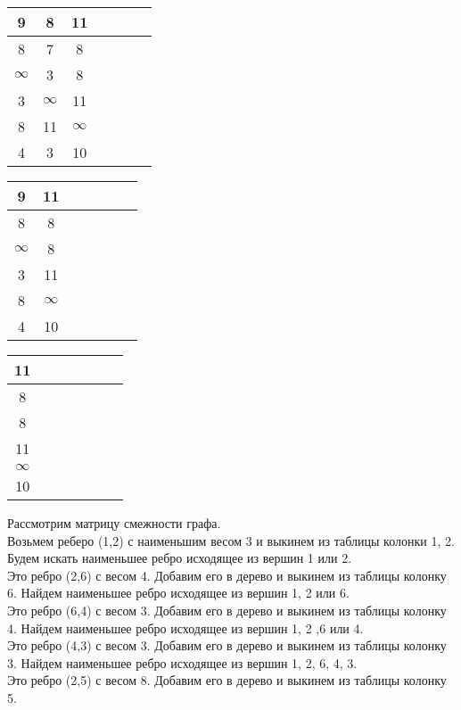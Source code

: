 \documentclass[a4paper,10pt]{article} %
\begin{document}
\begin{tabular}[]{|c|c|c|c|c|c|c|}
\hline
 \rowcolor{goodrow}  9 &    8 &   11 \\
\hline
 \rowcolor{goodrow} 8 &    7 &    8  \\
\hline
  $\infty$ &    3 &    8 \\
\hline
    3 &  $\infty$ &   11 \\
\hline
    8 &   11 &  $\infty$ \\
\hline
 \rowcolor{goodrow}    4 &    \cellcolor{yellow}3 &   10 \\
\hline
\end{tabular}
\hspace{7cm}
\begin{tabular}[]{|c|c|c|c|c|c|c|}
\hline
 \rowcolor{goodrow}  9 &   11 \\
\hline
 \rowcolor{goodrow} 8 &    8  \\
\hline
  $\infty$ &    8 \\
\hline
\rowcolor{goodrow}   \cellcolor{yellow}3 &   11 \\
\hline
    8 &  $\infty$ \\
\hline
 \rowcolor{goodrow}    4 &   10 \\
\hline
\end{tabular}

\medskip

\begin{tabular}[]{|c|c|c|c|c|c|c|}
\hline
 \rowcolor{goodrow}  11 \\
\hline
 \rowcolor{goodrow}  \cellcolor{yellow}8  \\
\hline
  \rowcolor{goodrow} 8 \\
\hline
\rowcolor{goodrow}  11 \\
\hline
 $\infty$ \\
\hline
 \rowcolor{goodrow}   10 \\
\hline
\end{tabular}

\bigskip

Рассмотрим матрицу смежности графа. \\

Возьмем реберо (1,2)  с наименьшим весом 3 и выкинем из таблицы колонки 1, 2. 
Будем искать наименьшее ребро исходящее из вершин 1 или 2.  \\
Это ребро (2,6) с весом 4. Добавим его в дерево и выкинем из таблицы колонку 6. Найдем наименьшее ребро исходящее из вершин 1, 2 или 6. \\
Это ребро (6,4) с весом 3. Добавим его в дерево и выкинем из таблицы колонку 4. Найдем наименьшее ребро исходящее из вершин 1, 2 ,6 или 4. \\
Это ребро (4,3) с весом 3. Добавим его в дерево и выкинем из таблицы колонку 3. Найдем наименьшее ребро исходящее из вершин 1, 2, 6, 4, 3.\\
Это ребро (2,5) с весом 8. Добавим его в дерево и выкинем из таблицы колонку 5. \\
\end{document}
